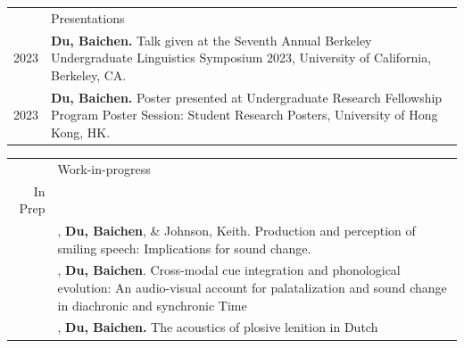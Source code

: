 \documentclass[letterpaper, 11pt]{article}
\newcommand{\headingfont}{\Large\color{MidnightBlue}}
\newenvironment{SectionTable}[1]{
	\renewcommand*{\arraystretch}{1.7}
	\setlength{\tabcolsep}{10pt}
	\begin{longtable}{Rp{6.3in}} & #1 \\}
{\end{longtable}\vspace{-.3cm}}
\begin{document}
\begin{SectionTable}{\headingfont Presentations}
2023 &
\textbf{Du, Baichen.}  Talk given at the {Seventh Annual Berkeley Undergraduate Linguistics Symposium 2023, University of California, Berkeley, CA.} \\

2023 &
\textbf{Du, Baichen.}  Poster presented at {Undergraduate Research Fellowship Program Poster Session: Student Research Posters, University of Hong Kong, HK.} \\

\end{SectionTable}

\begin{SectionTable}{\headingfont Work-in-progress}
 In Prep &
   \\
&
 , \textbf{Du, Baichen}, \& Johnson, Keith. Production and perception of smiling speech: Implications for sound change.\\

 &
 , \textbf{Du, Baichen}. Cross-modal cue integration and phonological evolution: An audio-visual account for palatalization and sound change in diachronic and synchronic Time \\

 &
 , \textbf{ Du, Baichen.} The acoustics of plosive lenition in Dutch \\

\end{SectionTable}



\end{document}

